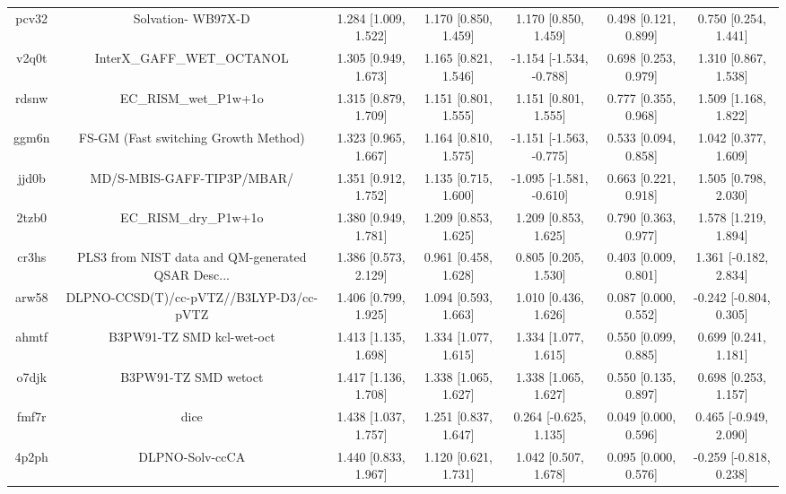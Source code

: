 \documentclass{article}
\begin{document}
\begin{center}
\begin{longtable}{|ccccccc|}
 pcv32 &                                 Solvation- WB97X-D &  1.284 [1.009, 1.522] &  1.170 [0.850, 1.459] &     1.170 [0.850, 1.459] &  0.498 [0.121, 0.899] &    0.750 [0.254, 1.441] \\
 v2q0t &                         InterX\_GAFF\_WET\_OCTANOL &  1.305 [0.949, 1.673] &  1.165 [0.821, 1.546] &  -1.154 [-1.534, -0.788] &  0.698 [0.253, 0.979] &    1.310 [0.867, 1.538] \\
 rdsnw &                              EC\_RISM\_wet\_P1w+1o &  1.315 [0.879, 1.709] &  1.151 [0.801, 1.555] &     1.151 [0.801, 1.555] &  0.777 [0.355, 0.968] &    1.509 [1.168, 1.822] \\
 ggm6n &               FS-GM (Fast switching Growth Method) &  1.323 [0.965, 1.667] &  1.164 [0.810, 1.575] &  -1.151 [-1.563, -0.775] &  0.533 [0.094, 0.858] &    1.042 [0.377, 1.609] \\
 jjd0b &                         MD/S-MBIS-GAFF-TIP3P/MBAR/ &  1.351 [0.912, 1.752] &  1.135 [0.715, 1.600] &  -1.095 [-1.581, -0.610] &  0.663 [0.221, 0.918] &    1.505 [0.798, 2.030] \\
 2tzb0 &                              EC\_RISM\_dry\_P1w+1o &  1.380 [0.949, 1.781] &  1.209 [0.853, 1.625] &     1.209 [0.853, 1.625] &  0.790 [0.363, 0.977] &    1.578 [1.219, 1.894] \\
 cr3hs &  PLS3 from NIST data and QM-generated QSAR Desc... &  1.386 [0.573, 2.129] &  0.961 [0.458, 1.628] &     0.805 [0.205, 1.530] &  0.403 [0.009, 0.801] &   1.361 [-0.182, 2.834] \\
 arw58 &            DLPNO-CCSD(T)/cc-pVTZ//B3LYP-D3/cc-pVTZ &  1.406 [0.799, 1.925] &  1.094 [0.593, 1.663] &     1.010 [0.436, 1.626] &  0.087 [0.000, 0.552] &  -0.242 [-0.804, 0.305] \\
 ahmtf &                          B3PW91-TZ SMD kcl-wet-oct &  1.413 [1.135, 1.698] &  1.334 [1.077, 1.615] &     1.334 [1.077, 1.615] &  0.550 [0.099, 0.885] &    0.699 [0.241, 1.181] \\
 o7djk &                               B3PW91-TZ SMD wetoct &  1.417 [1.136, 1.708] &  1.338 [1.065, 1.627] &     1.338 [1.065, 1.627] &  0.550 [0.135, 0.897] &    0.698 [0.253, 1.157] \\
 fmf7r &                                               dice &  1.438 [1.037, 1.757] &  1.251 [0.837, 1.647] &    0.264 [-0.625, 1.135] &  0.049 [0.000, 0.596] &   0.465 [-0.949, 2.090] \\
 4p2ph &                                    DLPNO-Solv-ccCA &  1.440 [0.833, 1.967] &  1.120 [0.621, 1.731] &     1.042 [0.507, 1.678] &  0.095 [0.000, 0.576] &  -0.259 [-0.818, 0.238] \\

\end{longtable}
\end{center}
\end{document}
